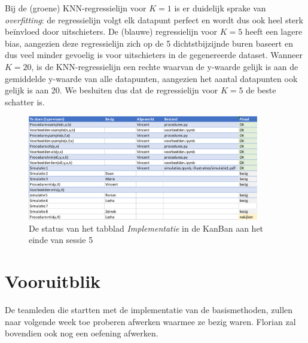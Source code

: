 \documentclass{article}
\begin{document}
Bij de (groene) KNN-regressielijn voor \(K=1\) is er duidelijk sprake van \textit{overfitting}: de regressielijn volgt elk datapunt perfect en wordt dus ook heel sterk beïnvloed door uitschieters. De (blauwe) regressielijn voor \(K=5\) heeft een lagere bias, aangezien deze regressielijn zich op de 5 dichtstbijzijnde buren baseert en dus veel minder gevoelig is voor uitschieters in de gegenereerde dataset. Wanneer \(K=20\), is de KNN-regressielijn een rechte waarvan de y-waarde gelijk is aan de gemiddelde y-waarde van alle datapunten, aangezien het aantal datapunten ook gelijk is aan 20. We besluiten dus dat de regressielijn voor \(K=5\) de beste schatter is.

\begin{figure}
	\centering
	\includegraphics[width=0.9\textwidth]{kanban_einde}
	\caption{De status van het tabblad \textit{Implementatie} in de KanBan aan het einde van sessie 5}
	\label{fig:kanban}
\end{figure}

\section*{Vooruitblik}

De teamleden die startten met de implementatie van de basismethoden, zullen naar volgende week toe proberen afwerken waarmee ze bezig waren. Florian zal bovendien ook nog een oefening afwerken.
\end{document}
